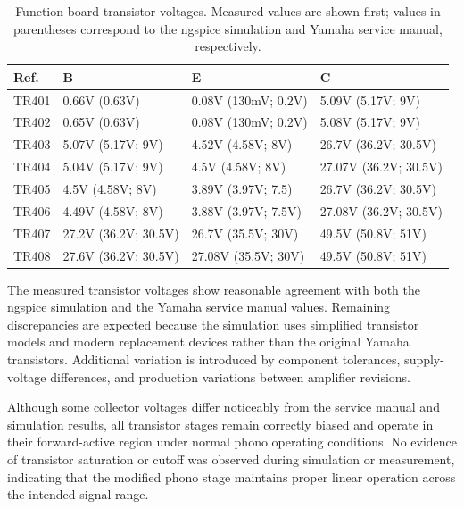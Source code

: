 \documentclass[]{article}
\begin{document}
\begin{table}[H]
	\centering
	\caption{Function board transistor voltages. Measured values are shown first; values in parentheses correspond to the ngspice simulation and Yamaha service manual, respectively.}
	\label{tab:function_board_voltages}
	\begin{tabular}{|l|l|l|l|}
    \hline
 \textbf{Ref.} & \textbf{B} & \textbf{E} & \textbf{C} \\
    \hline
    TR401 & 0.66V (0.63V) & 0.08V (130mV; 0.2V)  & 5.09V (5.17V; 9V) \\
    TR402 & 0.65V (0.63V) & 0.08V (130mV; 0.2V) & 5.08V (5.17V; 9V) \\
    TR403 & 5.07V (5.17V; 9V) & 4.52V (4.58V; 8V) & 26.7V (36.2V; 30.5V)  \\
    TR404 & 5.04V (5.17V; 9V) & 4.5V (4.58V; 8V)  & 27.07V (36.2V; 30.5V) \\
    TR405 & 4.5V (4.58V; 8V) & 3.89V (3.97V; 7.5) & 26.7V (36.2V; 30.5V)  \\
    TR406 & 4.49V (4.58V; 8V) & 3.88V (3.97V; 7.5V) & 27.08V (36.2V; 30.5V) \\
    TR407 & 27.2V (36.2V; 30.5V)  & 26.7V (35.5V; 30V) & 49.5V (50.8V; 51V) \\
    TR408 & 27.6V (36.2V; 30.5V) & 27.08V (35.5V; 30V) & 49.5V (50.8V; 51V) \\
    \hline
	\end{tabular}
\end{table}

The measured transistor voltages show reasonable agreement with both the ngspice simulation and the Yamaha service manual values. Remaining discrepancies are expected because the simulation uses simplified transistor models and modern replacement devices rather than the original Yamaha transistors. Additional variation is introduced by component tolerances, supply-voltage differences, and production variations between amplifier revisions.

Although some collector voltages differ noticeably from the service manual and simulation results, all transistor stages remain correctly biased and operate in their forward-active region under normal phono operating conditions. No evidence of transistor saturation or cutoff was observed during simulation or measurement, indicating that the modified phono stage maintains proper linear operation across the intended signal range.
\end{document}
